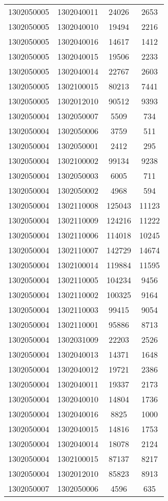 \begin{longtable}{llcc}
1302050005 & 1302040011 & 24026 & 2653\\
1302050005 & 1302040010 & 19494 & 2216\\
1302050005 & 1302040016 & 14617 & 1412\\
1302050005 & 1302040015 & 19506 & 2233\\
1302050005 & 1302040014 & 22767 & 2603\\
1302050005 & 1302100015 & 80213 & 7441\\
1302050005 & 1302012010 & 90512 & 9393\\
1302050004 & 1302050007 & 5509 & 734\\
1302050004 & 1302050006 & 3759 & 511\\
1302050004 & 1302050001 & 2412 & 295\\
1302050004 & 1302100002 & 99134 & 9238\\
1302050004 & 1302050003 & 6005 & 711\\
1302050004 & 1302050002 & 4968 & 594\\
1302050004 & 1302110008 & 125043 & 11123\\
1302050004 & 1302110009 & 124216 & 11222\\
1302050004 & 1302110006 & 114018 & 10245\\
1302050004 & 1302110007 & 142729 & 14674\\
1302050004 & 1302100014 & 119884 & 11595\\
1302050004 & 1302110005 & 104234 & 9456\\
1302050004 & 1302110002 & 100325 & 9164\\
1302050004 & 1302110003 & 99415 & 9054\\
1302050004 & 1302110001 & 95886 & 8713\\
1302050004 & 1302031009 & 22203 & 2526\\
1302050004 & 1302040013 & 14371 & 1648\\
1302050004 & 1302040012 & 19721 & 2386\\
1302050004 & 1302040011 & 19337 & 2173\\
1302050004 & 1302040010 & 14804 & 1736\\
1302050004 & 1302040016 & 8825 & 1000\\
1302050004 & 1302040015 & 14816 & 1753\\
1302050004 & 1302040014 & 18078 & 2124\\
1302050004 & 1302100015 & 87137 & 8217\\
1302050004 & 1302012010 & 85823 & 8913\\
1302050007 & 1302050006 & 4596 & 635\\

\end{longtable}
